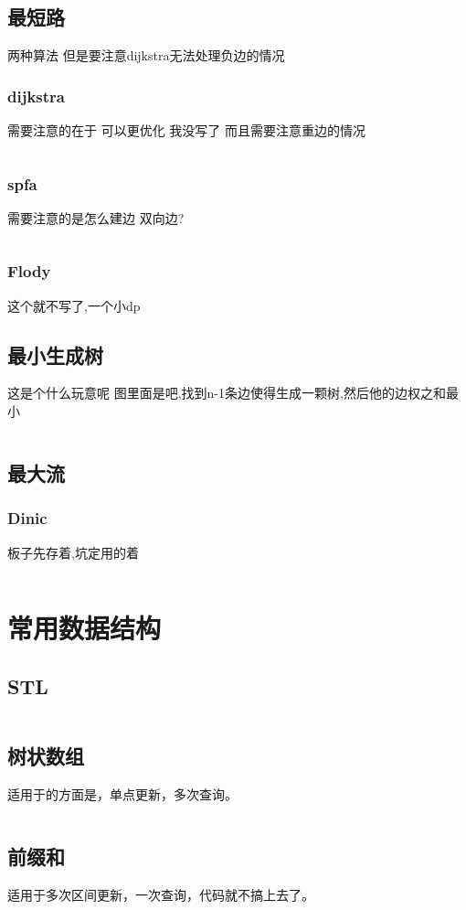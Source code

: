 \documentclass[a4paper,11pt]{article}
\begin{document}
\begin{CJK}{UTF8}{gbsn}
\subsection{最短路}
两种算法 但是要注意dijkstra无法处理负边的情况
\subsubsection{dijkstra}
需要注意的在于 可以更优化 我没写了 而且需要注意重边的情况
\inputminted{c++}{../scoure/Graph_theory/dijkstra.cpp}
\subsubsection{spfa}
需要注意的是怎么建边 双向边?
\inputminted{c++}{../scoure/Graph_theory/spfa.cpp}
\subsubsection{Flody}
这个就不写了,一个小dp
\subsection{最小生成树}
这是个什么玩意呢 图里面是吧,找到n-1条边使得生成一颗树,然后他的边权之和最小
\inputminted{c++}{../scoure/Graph_theory/prime.cpp}
\subsection{最大流}
\subsubsection{Dinic}
板子先存着,坑定用的着
\inputminted{c++}{../scoure/Graph_theory/dinic.cpp}
\newpage
\section{常用数据结构}
\subsection{STL}
\inputminted{c++}{../scoure/date/duilie.cpp}
\subsection{树状数组}
适用于的方面是，单点更新，多次查询。
\inputminted{c++}{../scoure/date/treevector.cpp}
\subsection{前缀和}
适用于多次区间更新，一次查询，代码就不搞上去了。

\end{CJK}
\end{document}
